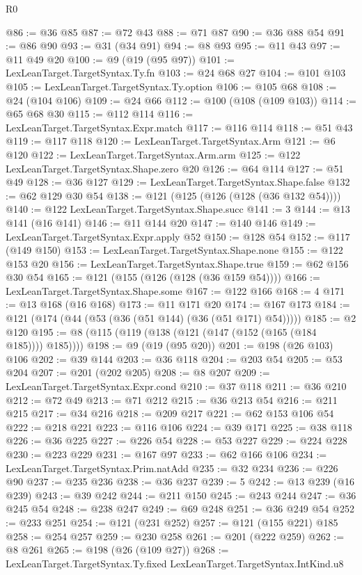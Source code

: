 \begin{lexlean}{R0}
\begin{coremodule}
{{{{{{{{{{{{{{{{{{{@86 := @36 @85
@87 := @72 @43
@88 := @71 @87
@90 := @36 @88 @54
@91 := @86 @90
@93 := @31 (@34 @91)
@94 := @8 @93
@95 := @11 @43
@97 := @11 @49 @20
@100 := @9 (@19 (@95 @97))
@101 := LexLeanTarget.TargetSyntax.Ty.fn
@103 := @24 @68 @27
@104 := @101 @103
@105 := LexLeanTarget.TargetSyntax.Ty.option
@106 := @105 @68
@108 := @24 (@104 @106)
@109 := @24 @66
@112 := @100 (@108 (@109 @103))
@114 := @65 @68 @30
@115 := @112 @114
@116 := LexLeanTarget.TargetSyntax.Expr.match
@117 := @116 @114
@118 := @51 @43
@119 := @117 @118
@120 := LexLeanTarget.TargetSyntax.Arm
@121 := @6 @120
@122 := LexLeanTarget.TargetSyntax.Arm.arm
@125 := @122 LexLeanTarget.TargetSyntax.Shape.zero @20
@126 := @64 @114
@127 := @51 @49
@128 := @36 @127
@129 := LexLeanTarget.TargetSyntax.Shape.false
@132 := @62 @129 @30 @54
@138 := @121 (@125 (@126 (@128 (@36 @132 @54))))
@140 := @122 LexLeanTarget.TargetSyntax.Shape.succ
@141 := 3
@144 := @13 @141 (@16 @141)
@146 := @11 @144 @20
@147 := @140 @146
@149 := LexLeanTarget.TargetSyntax.Expr.apply @52
@150 := @128 @54
@152 := @117 (@149 @150)
@153 := LexLeanTarget.TargetSyntax.Shape.none
@155 := @122 @153 @20
@156 := LexLeanTarget.TargetSyntax.Shape.true
@159 := @62 @156 @30 @54
@165 := @121 (@155 (@126 (@128 (@36 @159 @54))))
@166 := LexLeanTarget.TargetSyntax.Shape.some
@167 := @122 @166
@168 := 4
@171 := @13 @168 (@16 @168)
@173 := @11 @171 @20
@174 := @167 @173
@184 := @121 (@174 (@44 (@53 (@36 (@51 @144) (@36 (@51 @171) @54)))))
@185 := @2 @120
@195 := @8 (@115 (@119 (@138 (@121 (@147 (@152 (@165 (@184 @185)))) @185))))
@198 := @9 (@19 (@95 @20))
@201 := @198 (@26 @103) @106
@202 := @39 @144
@203 := @36 @118
@204 := @203 @54
@205 := @53 @204
@207 := @201 (@202 @205)
@208 := @8 @207
@209 := LexLeanTarget.TargetSyntax.Expr.cond
@210 := @37 @118
@211 := @36 @210
@212 := @72 @49
@213 := @71 @212
@215 := @36 @213 @54
@216 := @211 @215
@217 := @34 @216
@218 := @209 @217
@221 := @62 @153 @106 @54
@222 := @218 @221
@223 := @116 @106
@224 := @39 @171
@225 := @38 @118
@226 := @36 @225
@227 := @226 @54
@228 := @53 @227
@229 := @224 @228
@230 := @223 @229
@231 := @167 @97
@233 := @62 @166 @106
@234 := LexLeanTarget.TargetSyntax.Prim.natAdd
@235 := @32 @234
@236 := @226 @90
@237 := @235 @236
@238 := @36 @237
@239 := 5
@242 := @13 @239 (@16 @239)
@243 := @39 @242
@244 := @211 @150
@245 := @243 @244
@247 := @36 @245 @54
@248 := @238 @247
@249 := @69 @248
@251 := @36 @249 @54
@252 := @233 @251
@254 := @121 (@231 @252)
@257 := @121 (@155 @221) @185
@258 := @254 @257
@259 := @230 @258
@261 := @201 (@222 @259)
@262 := @8 @261
@265 := @198 (@26 (@109 @27))
@268 := LexLeanTarget.TargetSyntax.Ty.fixed LexLeanTarget.TargetSyntax.IntKind.u8
}}}}}}}}}}}}}}}}}}}
\end{coremodule}
\end{lexlean}
